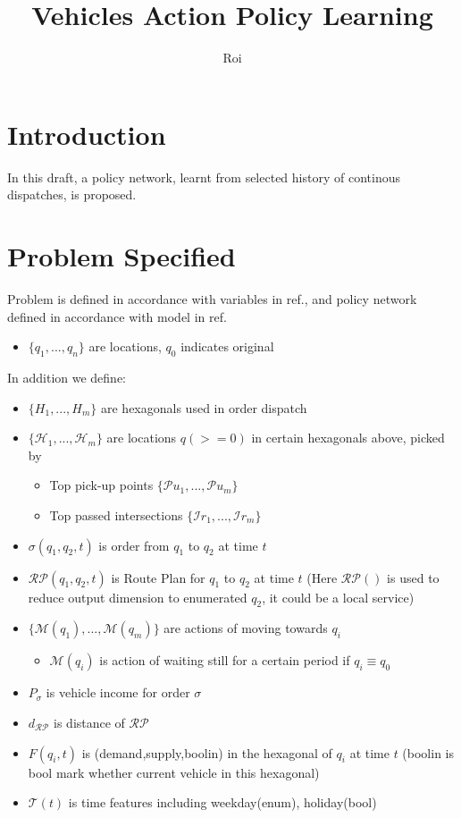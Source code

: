 \documentclass{article}
\title{Vehicles Action Policy Learning}
\author{Roi}
\begin{document}
\maketitle{}

\section{Introduction}
In this draft, a policy network, learnt from selected history of continous dispatches, is proposed.


\section{Problem Specified}
Problem is defined in accordance with variables in ref.\cite{r1}, and policy network defined in accordance with model in ref.\cite{r2}
\begin{itemize}
    \item $\{q_1,...,q_n\}$ are locations, $q_0$ indicates original
\end{itemize}

\noindent
In addition we define:
\begin{itemize}
    \item $\{H_1,...,H_m\}$ are hexagonals used in order dispatch
    \item $\{\mathcal{H}_1,...,\mathcal{H}_m\}$ are locations $q (>=0)$ in certain hexagonals above, picked by
    \begin{itemize}
        \item Top pick-up points $\{\mathcal{P}u_1,...,\mathcal{P}u_m\}$
        \item Top passed intersections $\{\mathcal{I}r_1,...,\mathcal{I}r_m\}$
    \end{itemize}
    \item $\sigma(q_1,q_2,t)$ is order from $q_1$ to $q_2$ at time $t$
    \item $\mathcal{RP}\left(q_1, q_2, t\right)$ is Route Plan for $q_1$ to $q_2$ at time $t$ 
            (Here $\mathcal{RP}()$ is used to reduce output dimension to enumerated $q_2$, 
            it could be a local service)
    \item $\{\mathcal{M}(q_1),...,\mathcal{M}(q_m)\}$ are actions of moving towards $q_i$
    \begin{itemize}
        \item $\mathcal{M}(q_i)$ is action of waiting still for a certain period if $q_i\equiv q_0$
    \end{itemize}
    \item $P_{\sigma}$ is vehicle income for order $\sigma$
    \item $d_{\mathcal{RP}}$ is distance of $\mathcal{RP}$
    \item $F(q_i,t)$ is (demand,supply,boolin) in the hexagonal of $q_i$ at time $t$ 
            (boolin is bool mark whether current vehicle in this hexagonal)
    \item $\mathcal{T}(t)$ is time features including weekday(enum), holiday(bool)
\end{itemize}
\end{document}
